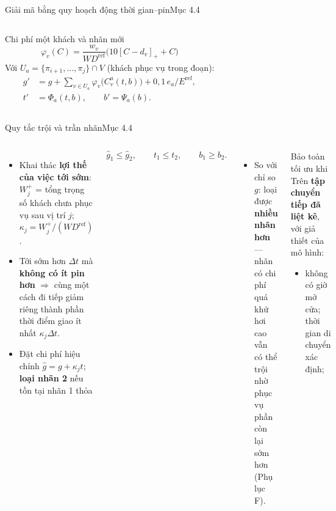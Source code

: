 \documentclass[aspectratio=169,10pt,t,xcolor={table}]{beamer}
\newcommand{\pos}[1]{\left[#1\right]_{+}}
\newcommand{\Dref}{D^{\mathrm{ref}}}
\newcommand{\Eref}{E^{\mathrm{ref}}}
\newcommand{\src}[1]{\hfill{\normalfont\footnotesize\color{white!62!navy}#1}}  %
\begin{document}
\begin{frame}{Giải mã bằng quy hoạch động thời gian--pin\src{Mục 4.4}}
\begin{columns}[T,onlytextwidth]
\begin{block}{Chi phí một khách và nhãn mới}
\begin{equation}\tag{5}
\varphi_v(C)=\frac{w_v}{W\Dref}\bigl(10\pos{C-d_v}+C\bigr)
\end{equation}
Với $U_a=\{\pi_{i+1},\ldots,\pi_j\}\cap V$ (khách phục vụ trong đoạn):
\begin{equation}\tag{6}
\begin{aligned}
g'&=g+\textstyle\sum_{v\in U_a}\varphi_v\bigl(C_v^a(t,b)\bigr)+0{,}1\,e_a/\Eref,\\
t'&=\Phi_a(t,b),\qquad b'=\Psi_a(b).
\end{aligned}
\end{equation}
\end{block}
\end{columns}
\end{frame}

\begin{frame}{Quy tắc trội và trần nhãn\src{Mục 4.4}}
\begin{columns}[T,onlytextwidth]
\begin{itemize}\footnotesize
\item Khai thác \textbf{lợi thế của việc tới sớm}: $W_j^+$ = tổng trọng số khách chưa phục vụ sau vị trí $j$; $\kappa_j=W_j^+/(W\Dref)$.
\item Tới sớm hơn $\Delta t$ mà \textbf{không có ít pin hơn} $\Rightarrow$ cùng một cách đi tiếp giảm riêng thành phần thời điểm giao ít nhất $\kappa_j\Delta t$.
\item Đặt chi phí hiệu chỉnh $\widehat g=g+\kappa_j t$; \textbf{loại nhãn 2} nếu tồn tại nhãn 1 thỏa
\end{itemize}
\vspace{-4pt}
\begin{equation}\tag{7}
\widehat g_1\le\widehat g_2,\qquad t_1\le t_2,\qquad b_1\ge b_2.
\end{equation}
\vspace{-6pt}
\begin{itemize}\footnotesize
\item So với chỉ so $g$: loại được \textbf{nhiều nhãn hơn} --- nhãn có chi phí quá khứ hơi cao vẫn có thể trội nhờ phục vụ phần còn lại sớm hơn (Phụ lục F).
\end{itemize}
\begin{block}{Bảo toàn tối ưu khi}
\scriptsize Trên \textbf{tập chuyển tiếp đã liệt kê}, với giả thiết của mô hình:
\begin{itemize}
\item không có giờ mở cửa; thời gian di chuyển xác định;

\end{itemize}
\end{block}
\end{columns}
\end{frame}
\end{document}

